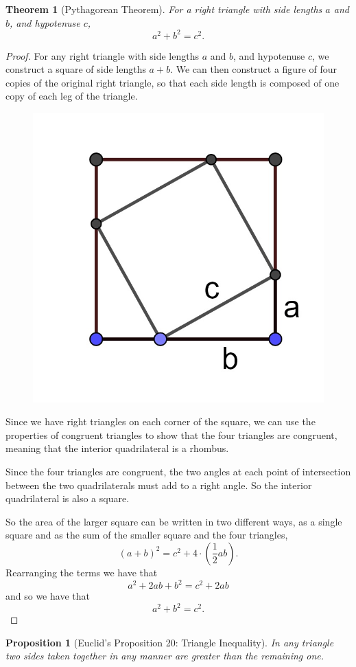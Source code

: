 \documentclass[
]{book}
\newtheorem{theorem}{Theorem}[chapter]
\newtheorem{proposition}{Proposition}[chapter]
\theoremstyle{definition}
\theoremstyle{definition}
\theoremstyle{definition}
\theoremstyle{definition}
\theoremstyle{remark}
\begin{document}
\begin{theorem}[Pythagorean Theorem]
For a right triangle with side lengths \(a\) and \(b\), and hypotenuse \(c\),
\[a^2+b^2=c^2.\]
\end{theorem}

\begin{proof}
For any right triangle with side lengths \(a\) and \(b\), and hypotenuse \(c\), we construct a square of side lengths \(a+b\). We can then construct a figure of four copies of the original right triangle, so that each side length is composed of one copy of each leg of the triangle.

\begin{figure}

{\centering \includegraphics[width=0.2\linewidth]{images/pythagorean1} 

}

\end{figure}

Since we have right triangles on each corner of the square, we can use the properties of congruent triangles to show that the four triangles are congruent, meaning that the interior quadrilateral is a rhombus.

Since the four triangles are congruent, the two angles at each point of intersection between the two quadrilaterals must add to a right angle. So the interior quadrilateral is also a square.

So the area of the larger square can be written in two different ways, as a single square and as the sum of the smaller square and the four triangles, \[(a+b)^2 = c^2 + 4 \cdot \left( \frac{1}{2} ab \right) .\]
Rearranging the terms we have that \[a^2+2ab+b^2 = c^2+2ab\] and so we have that \[a^2+b^2=c^2.\]
\end{proof}

\begin{proposition}[Euclid's Proposition 20: Triangle Inequality]
\protect\hypertarget{prp:prop20}{}\label{prp:prop20}In any triangle two sides taken together in any manner are greater than the remaining one.
\end{proposition}
\end{document}
